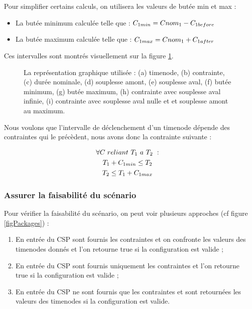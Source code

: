 Pour simplifier certains calculs, on utilisera les valeurs de butée min et max :
\begin{itemize}
    \item La butée minimum calculée telle que : $ C_{1min} = Cnom_{1} - C_{1before} $
    \item La butée maximum calculée telle que : $ C_{1max} = Cnom_{1} + C_{1after} $
\end{itemize}

Ces intervalles sont montrés visuellement sur la figure \ref{figNotations}.

\begin{figure}[ht]
    \centering
    \caption{La représentation graphique utilisée : (a) \gls{timenode}, (b) contrainte, (c) durée nominale, (d) souplesse amont, (e) souplesse aval, (f) butée minimum, (g) butée maximum, (h) contrainte avec souplesse aval infinie, (i) contrainte avec souplesse aval nulle et et souplesse amont au maximum. \label{figNotations}}
\end{figure}

Nous voulons que l'intervalle de déclenchement d'un \gls{timenode} dépende des contraintes qui le précèdent, nous avons donc la contrainte suivante : 

\begin{gather*}
    \forall C_{}~reliant~T_{1}~a~T_{2}~:\\
    T_{1} + C_{1min} \leq T_{2}\\
    T_{2} \leq T_{1} + C_{1max}
\end{gather*}

\subsubsection{Assurer la faisabilité du scénario}

Pour vérifier la faisabilité du scénario, on peut voir plusieurs approches (cf figure \ref{figPackages}) :
\begin{enumerate}
    \item En entrée du CSP sont fournis les contraintes et on confronte les valeurs des timenodes donnés et l'on retourne true si la configuration est valide ;
    \item En entrée du CSP sont fournis uniquement les contraintes et l'on retourne true si la configuration est valide ;
    \item En entrée du CSP ne sont fournis que les contraintes et sont retournées les valeurs des timenodes si la configuration est valide.
\end{enumerate}

